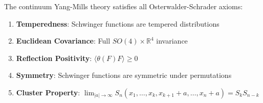 \begin{theorem}
\label{thm:complete-os}
The continuum Yang-Mills theory satisfies all Osterwalder-Schrader axioms:
\begin{enumerate}[label=\textbf{OS\arabic*:}]
\item \textbf{Temperedness}: Schwinger functions are tempered distributions
\item \textbf{Euclidean Covariance}: Full $SO(4) \times \mathbb{R}^4$ invariance
\item \textbf{Reflection Positivity}: $\langle \theta(F) F \rangle \geq 0$
\item \textbf{Symmetry}: Schwinger functions are symmetric under permutations
\item \textbf{Cluster Property}: $\lim_{|a| \to \infty} S_n(x_1, \ldots, x_k, x_{k+1}+a, \ldots, x_n+a) = S_k S_{n-k}$
\end{enumerate}
\end{theorem}

